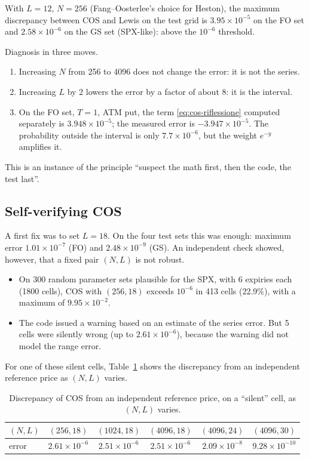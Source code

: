 \begin{esempio}[title={Example: the literature choice $L=12$}]
With $L=12$, $N=256$ (Fang--Oosterlee's choice for Heston), the maximum discrepancy between COS and Lewis on the test
grid is ${3.95\times10^{-5}}$ on the FO set and ${2.58\times10^{-6}}$ on the GS set (SPX-like): above the $10^{-6}$
threshold.

Diagnosis in three moves.
\begin{enumerate}
\item Increasing $N$ from 256 to 4096 does not change the error: it is not the series.
\item Increasing $L$ by 2 lowers the error by a factor of about 8: it is the interval.
\item On the FO set, $T=1$, ATM put, the term \eqref{eq:cos-riflessione} computed separately is
${3.948\times10^{-5}}$; the measured error is $-{3.947\times10^{-5}}$. The probability outside the interval is only
${7.7\times10^{-6}}$, but the weight $e^{-y}$ amplifies it.
\end{enumerate}
This is an instance of the principle ``suspect the math first, then the code, the test last''.
\end{esempio}

\subsection{Self-verifying COS}
A first fix was to set $L=18$. On the four test sets this was enough: maximum error ${1.01\times10^{-7}}$ (FO) and
${2.48\times10^{-9}}$ (GS). An independent check showed, however, that a fixed pair $(N,L)$ is not robust.

\begin{itemize}
\item On 300 random parameter sets plausible for the SPX, with 6 expiries each (1800 cells), COS with $(256,18)$
exceeds $10^{-6}$ in 413 cells (22.9\%), with a maximum of ${9.95\times10^{-2}}$.
\item The code issued a warning based on an estimate of the series error. But 5 cells were silently wrong (up to
${2.61\times10^{-6}}$), because the warning did not model the range error.
\end{itemize}

For one of these silent cells, Table~\ref{tab:cos-NL} shows the discrepancy from an independent reference price as
$(N,L)$ varies.

\begin{table}[htbp]
\centering
\small
\caption{Discrepancy of COS from an independent reference price, on a ``silent'' cell, as $(N,L)$ varies.}
\label{tab:cos-NL}
\begin{tabular}{@{}lccccc@{}}
\toprule
$(N,L)$ & $(256,18)$ & $(1024,18)$ & $(4096,18)$ & $(4096,24)$ & $(4096,30)$\\
\midrule
error & ${2.61\times10^{-6}}$ & ${2.51\times10^{-6}}$ & ${2.51\times10^{-6}}$ & ${2.09\times10^{-8}}$ & ${9.28\times10^{-10}}$\\
\bottomrule
\end{tabular}
\end{table}

